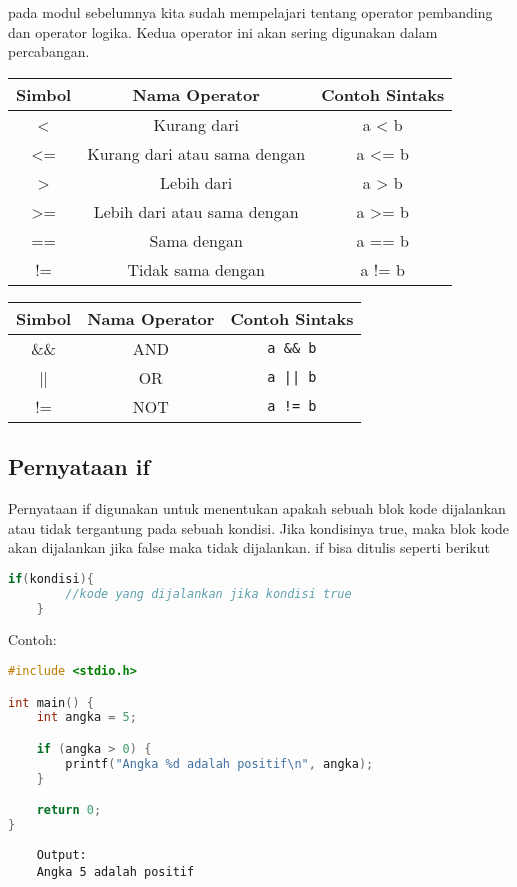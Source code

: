 pada modul sebelumnya kita sudah mempelajari tentang operator pembanding dan operator logika.
Kedua operator ini akan sering digunakan dalam percabangan.
\begin{center}
\begin{tabular}{|c|c|c|}
\hline
\textbf{Simbol} & \textbf{Nama Operator} & \textbf{Contoh Sintaks} \\ \hline
<    & Kurang dari 					& a < b  \\ \hline
<=   & Kurang dari atau sama dengan & a <= b \\ \hline
>    & Lebih dari 					& a > b  \\ \hline
>=   & Lebih dari atau sama dengan 	& a >= b \\ \hline
==   & Sama dengan 					& a == b \\ \hline
!=   & Tidak sama dengan 			& a != b \\ \hline
\end{tabular}
\begin{tabular}{|c|c|c|}
\hline
\textbf{Simbol} & \textbf{Nama Operator} & \textbf{Contoh Sintaks} \\ \hline
\&\&	& AND 	& \verb|a && b| \\ \hline
||   	& OR 	& \verb!a || b! \\ \hline
!=    	& NOT 	& \verb|a != b| \\ \hline
\end{tabular}
\end{center}

\subsection{Pernyataan if}

Pernyataan if digunakan untuk menentukan apakah sebuah blok kode dijalankan atau tidak tergantung pada sebuah kondisi.
Jika kondisinya true, maka blok kode akan dijalankan jika false maka tidak dijalankan.
if bisa ditulis seperti berikut
{
\captionsetup[lstlisting]{labelformat=empty, justification=raggedright, singlelinecheck=false} %
\begin{lstlisting}[language=c, caption={syntax}]
	if(kondisi){
		//kode yang dijalankan jika kondisi true
	}
\end{lstlisting}
}
Contoh:
\begin{lstlisting}[language=c]
#include <stdio.h>

int main() {
	int angka = 5;

	if (angka > 0) {
		printf("Angka %d adalah positif\n", angka);
	}

	return 0;
}
\end{lstlisting}
\begin{verbatim}
    Output:
    Angka 5 adalah positif
\end{verbatim}

